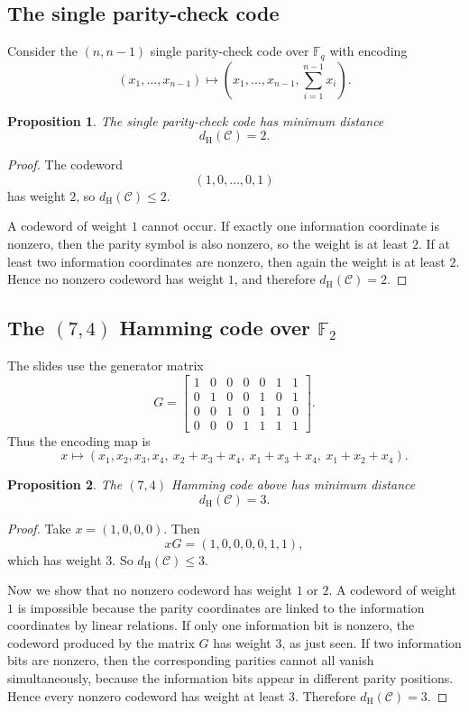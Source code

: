 \documentclass[11pt]{article}
\newtheorem{proposition}{Proposition}[section]
\theoremstyle{definition}
\theoremstyle{remark}
\newcommand{\F}{\mathbb{F}}
\newcommand{\code}{\mathcal{C}}
\newcommand{\dH}{d_{\mathrm H}}
\begin{document}
\subsection{The single parity-check code}

Consider the $(n,n-1)$ single parity-check code over $\F_q$ with encoding
\[
(x_1,\dots,x_{n-1})\longmapsto \left(x_1,\dots,x_{n-1},\sum_{i=1}^{n-1}x_i\right).
\]

\begin{proposition}
The single parity-check code has minimum distance
\[
\dH(\code)=2.
\]
\end{proposition}

\begin{proof}
The codeword
\[
(1,0,\dots,0,1)
\]
has weight $2$, so $\dH(\code)\le 2$.

A codeword of weight $1$ cannot occur. If exactly one information coordinate is nonzero, then the parity symbol is also nonzero, so the weight is at least $2$. If at least two information coordinates are nonzero, then again the weight is at least $2$. Hence no nonzero codeword has weight $1$, and therefore $\dH(\code)=2$.
\end{proof}

\subsection{\texorpdfstring{The $(7,4)$ Hamming code over $\F_2$}{The (7,4) Hamming code over F2}}

The slides use the generator matrix
\[
G=
\begin{bmatrix}
1&0&0&0&0&1&1\\
0&1&0&0&1&0&1\\
0&0&1&0&1&1&0\\
0&0&0&1&1&1&1
\end{bmatrix}.
\]
Thus the encoding map is
\[
x\longmapsto (x_1,x_2,x_3,x_4,\ x_2+x_3+x_4,\ x_1+x_3+x_4,\ x_1+x_2+x_4).
\]

\begin{proposition}
The $(7,4)$ Hamming code above has minimum distance
\[
\dH(\code)=3.
\]
\end{proposition}

\begin{proof}
Take $x=(1,0,0,0)$. Then
\[
xG=(1,0,0,0,0,1,1),
\]
which has weight $3$. So $\dH(\code)\le 3$.

Now we show that no nonzero codeword has weight $1$ or $2$. A codeword of weight $1$ is impossible because the parity coordinates are linked to the information coordinates by linear relations. If only one information bit is nonzero, the codeword produced by the matrix $G$ has weight $3$, as just seen. If two information bits are nonzero, then the corresponding parities cannot all vanish simultaneously, because the information bits appear in different parity positions. Hence every nonzero codeword has weight at least $3$. Therefore $\dH(\code)=3$.
\end{proof}
\end{document}
